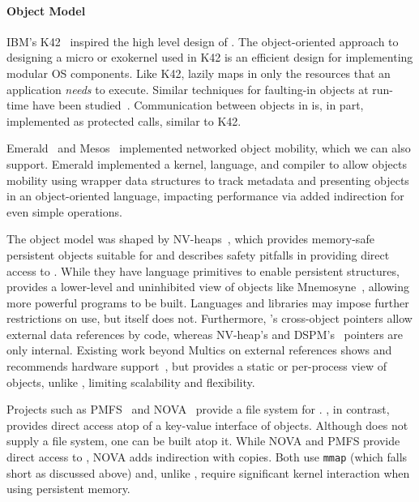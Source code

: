 {    \paragraph{Object Model}
    IBM's K42~\cite{k42}
    inspired the high level design of \Twizzler. The
    object-oriented approach to designing a micro or exokernel used in K42 is an
    efficient design for implementing modular OS components.
    Like K42, \Twizzler lazily maps in only the resources that an
    application \emph{needs} to execute. Similar techniques for faulting-in objects at
    run-time have been studied~\cite{Hosking1993}. Communication between objects in
    \Twizzler is, in part, implemented as protected calls, similar to K42.

    Emerald~\cite{jul_implementation_1991,jul:tocs88} and Mesos~\cite{Hindman}
    implemented networked object mobility, which
    we can also support. Emerald implemented a kernel, language, and
    compiler to allow objects mobility using
    wrapper data structures to track metadata and presenting
    objects in an object-oriented language, impacting performance via added indirection for even simple
    operations.

    The \Twizzler object model was shaped by
    NV-heaps~\cite{coburn:asplos11}, which provides memory-safe persistent objects
    suitable for \NVM and describes safety pitfalls in
    providing direct access to \NVM. While they
    have language primitives to enable persistent
    structures, \Twizzler provides a lower-level and uninhibited view of
    objects like Mnemosyne~\cite{volos:asplos11}, allowing
    more powerful programs to be built. Languages and libraries may impose
    further restrictions on \NVM use, but \Twizzler itself does not.
    Furthermore, \Twizzler's cross-object pointers allow external data
    references by code, whereas NV-heap's and DSPM's~\cite{shan:socc17} pointers are
    only internal. Existing work beyond Multics on external references shows and
    recommends hardware support~\cite{wang:micro17,libpmem}, but provides a
    static or per-process view of objects, unlike \Twizzler, limiting scalability and flexibility.

    Projects such as PMFS~\cite{dulloor:eurosys14} and
    NOVA~\cite{Xu:nova} provide a file system for \NVM. \Twizzler, in
    contrast, provides direct \NVM access atop of a key-value interface of objects.
    Although \Twizzler does not supply a file system, one can be built
    atop it. While NOVA
    and PMFS provide direct access to \NVM, NOVA adds indirection
    with copies. Both use \texttt{mmap} (which falls short as
    discussed above) and, unlike \Twizzler, require significant kernel interaction
    when using persistent memory.

}
